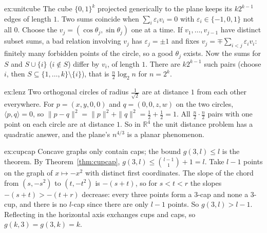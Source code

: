 \begin{solution}{ex:unitcube}
\idea The cube $\{0,1\}^k$ projected generically to the plane keeps its $k2^{k-1}$ edges of length $1$.
\writeup Two sums coincide when $\sum_i\varepsilon_iv_i=0$ with $\varepsilon_i\in\{-1,0,1\}$ not all $0$. Choose the $v_j=(\cos\theta_j,\sin\theta_j)$
one at a time. If $v_1,\dots,v_{j-1}$ have distinct subset sums, a bad relation involving $v_j$ has $\varepsilon_j=\pm1$ and fixes
$v_j=\mp\sum_{i<j}\varepsilon_iv_i$: finitely many forbidden points of the circle, so a good $\theta_j$ exists. Now the sums for $S$ and $S\cup\{i\}$
($i\notin S$) differ by $v_i$, of length $1$. There are $k2^{k-1}$ such pairs (choose $i$, then $S\subseteq\{1,\dots,k\}\setminus\{i\}$), that is
$\frac n2\log_2n$ for $n=2^k$.
\end{solution}

\begin{solution}{ex:lenz}
\idea Two orthogonal circles of radius $\frac1{\sqrt2}$ are at distance $1$ from each other everywhere.
\writeup For $p=(x,y,0,0)$ and $q=(0,0,z,w)$ on the two circles, $\langle p,q\rangle=0$, so $\|p-q\|^2=\|p\|^2+\|q\|^2=\frac12+\frac12=1$. All
$\frac n2\cdot\frac n2$ pairs with one point on each circle are at distance $1$. So in $\mathbb R^4$ the unit distance problem has a quadratic answer, and
the plane's $n^{4/3}$ is a planar phenomenon.
\end{solution}

\begin{solution}{ex:cupcap}
\idea Concave graphs only contain caps; the bound $g(3,l)\le l$ is the theorem.
\writeup By Theorem~\ref{thm:cupcap}, $g(3,l)\le\binom{l-1}1+1=l$. Take $l-1$ points on the graph of $x\mapsto-x^2$ with distinct first coordinates.
The slope of the chord from $(s,-s^2)$ to $(t,-t^2)$ is $-(s+t)$, so for $s<t<r$ the slopes $-(s+t)>-(t+r)$ decrease: every three points form a $3$-cap and
none a $3$-cup, and there is no $l$-cap since there are only $l-1$ points. So $g(3,l)>l-1$. Reflecting in the horizontal axis exchanges cups and caps,
so $g(k,3)=g(3,k)=k$.
\end{solution}

